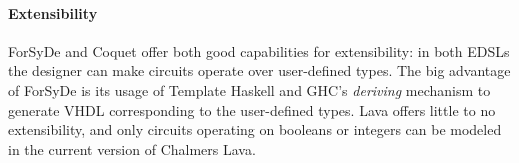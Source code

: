     \paragraph{Extensibility}
        ForSyDe and Coquet offer both good capabilities for extensibility: in both EDSLs the
        designer can make circuits operate over user-defined types. The big advantage of ForSyDe is
        its usage of Template Haskell and GHC's \emph{deriving} mechanism to generate VHDL
        corresponding to the user-defined types. Lava offers little to no extensibility, and only
        circuits operating on booleans or integers can be modeled in the current version of Chalmers
        Lava.

